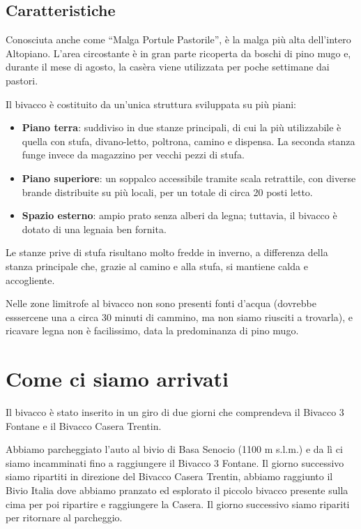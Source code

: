 \documentclass{article}
\begin{document}
\subsection{Caratteristiche}
Conosciuta anche come “Malga Portule Pastorile”, è la malga più alta dell’intero Altopiano. L’area circostante è in gran parte ricoperta da boschi di pino mugo e, durante il mese di agosto, la casèra viene utilizzata per poche settimane dai pastori.

Il bivacco è costituito da un’unica struttura sviluppata su più piani:
\begin{itemize}
    \item \textbf{Piano terra}: suddiviso in due stanze principali, di cui la più utilizzabile è quella con stufa, divano-letto, poltrona, camino e dispensa. La seconda stanza funge invece da magazzino per vecchi pezzi di stufa.
    \item \textbf{Piano superiore}: un soppalco accessibile tramite scala retrattile, con diverse brande distribuite su più locali, per un totale di circa 20 posti letto.
    \item \textbf{Spazio esterno}: ampio prato senza alberi da legna; tuttavia, il bivacco è dotato di una legnaia ben fornita.
\end{itemize}

Le stanze prive di stufa risultano molto fredde in inverno, a differenza della stanza principale che, grazie al camino e alla stufa, si mantiene calda e accogliente.

Nelle zone limitrofe al bivacco non sono presenti fonti d’acqua (dovrebbe esssercene una a circa 30 minuti di cammino, ma non siamo riusciti a trovarla), e ricavare legna non è facilissimo, data la predominanza di pino mugo.


\section{Come ci siamo arrivati}
Il bivacco è stato inserito in un giro di due giorni che comprendeva il Bivacco 3 Fontane e il Bivacco Casera Trentin.

Abbiamo parcheggiato l’auto al bivio di Basa Senocio (1100 m s.l.m.) e da lì ci siamo incamminati fino a raggiungere il Bivacco 3 Fontane. Il giorno successivo siamo ripartiti in direzione del Bivacco Casera Trentin, abbiamo raggiunto il Bivio Italia dove abbiamo pranzato ed esplorato il piccolo bivacco presente sulla cima per poi ripartire e raggiungere la Casera. Il giorno successivo siamo ripariti per ritornare al parcheggio.
\end{document}
